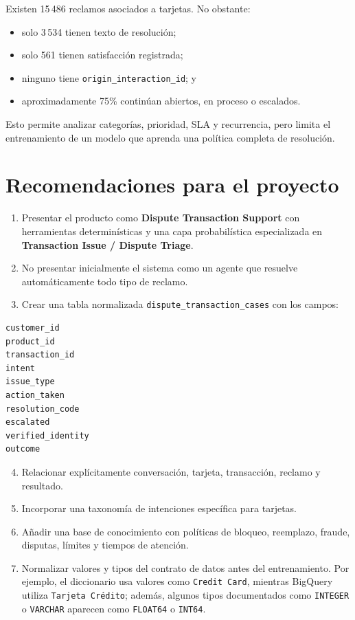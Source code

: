 \documentclass[11pt,a4paper]{article}
\begin{document}
Existen 15\,486 reclamos asociados a tarjetas. No obstante:

\begin{itemize}
  \item solo 3\,534 tienen texto de resolución;
  \item solo 561 tienen satisfacción registrada;
  \item ninguno tiene \texttt{origin\_interaction\_id}; y
  \item aproximadamente 75\% continúan abiertos, en proceso o escalados.
\end{itemize}

Esto permite analizar categorías, prioridad, SLA y recurrencia, pero limita el entrenamiento de un modelo que aprenda una política completa de resolución.

\section{Recomendaciones para el proyecto}

\begin{enumerate}
  \item Presentar el producto como \textbf{Dispute Transaction Support} con herramientas determinísticas y una capa probabilística especializada en \textbf{Transaction Issue / Dispute Triage}.
  \item No presentar inicialmente el sistema como un agente que resuelve automáticamente todo tipo de reclamo.
  \item Crear una tabla normalizada \texttt{dispute\_transaction\_cases} con los campos:
\end{enumerate}

\begin{lstlisting}
customer_id
product_id
transaction_id
intent
issue_type
action_taken
resolution_code
escalated
verified_identity
outcome
\end{lstlisting}

\begin{enumerate}
  \setcounter{enumi}{3}
  \item Relacionar explícitamente conversación, tarjeta, transacción, reclamo y resultado.
  \item Incorporar una taxonomía de intenciones específica para tarjetas.
  \item Añadir una base de conocimiento con políticas de bloqueo, reemplazo, fraude, disputas, límites y tiempos de atención.
  \item Normalizar valores y tipos del contrato de datos antes del entrenamiento. Por ejemplo, el diccionario usa valores como \texttt{Credit Card}, mientras BigQuery utiliza \texttt{Tarjeta Crédito}; además, algunos tipos documentados como \texttt{INTEGER} o \texttt{VARCHAR} aparecen como \texttt{FLOAT64} o \texttt{INT64}.
\end{enumerate}
\end{document}
